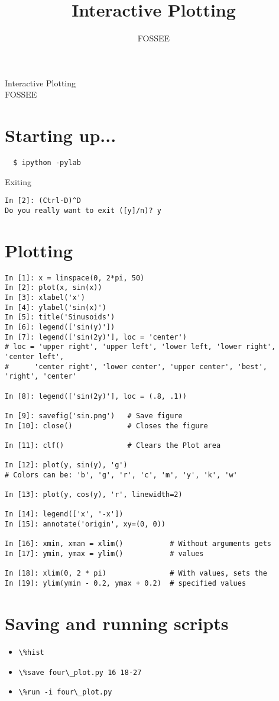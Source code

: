 \documentclass[12pt]{article}
\title{Interactive Plotting}
\author{FOSSEE}
\newcommand{\typ}[1]{\lstinline{#1}}
\begin{document}
\date{}
\vspace{-1in}
\begin{center}
\LARGE{Interactive Plotting}\\
\large{FOSSEE}
\end{center}
\section{Starting up...}

\begin{lstlisting}
  $ ipython -pylab  
\end{lstlisting}
Exiting 
\begin{lstlisting}     
In [2]: (Ctrl-D)^D
Do you really want to exit ([y]/n)? y
\end{lstlisting}

\section{Plotting}

  \begin{lstlisting}
In [1]: x = linspace(0, 2*pi, 50)
In [2]: plot(x, sin(x))
In [3]: xlabel('x')
In [4]: ylabel('sin(x)')
In [5]: title('Sinusoids')
In [6]: legend(['sin(y)'])
In [7]: legend(['sin(2y)'], loc = 'center')
# loc = 'upper right', 'upper left', 'lower left, 'lower right', 'center left',
#      'center right', 'lower center', 'upper center', 'best', 'right', 'center'

In [8]: legend(['sin(2y)'], loc = (.8, .1))

In [9]: savefig('sin.png')   # Save figure
In [10]: close()             # Closes the figure

In [11]: clf()               # Clears the Plot area

In [12]: plot(y, sin(y), 'g')
# Colors can be: 'b', 'g', 'r', 'c', 'm', 'y', 'k', 'w'

In [13]: plot(y, cos(y), 'r', linewidth=2)

In [14]: legend(['x', '-x'])
In [15]: annotate('origin', xy=(0, 0))

In [16]: xmin, xman = xlim()           # Without arguments gets
In [17]: ymin, ymax = ylim()           # values

In [18]: xlim(0, 2 * pi)               # With values, sets the
In [19]: ylim(ymin - 0.2, ymax + 0.2)  # specified values
  \end{lstlisting}

\section{Saving and running scripts}
\begin{itemize}
  \item \typ{\%hist}
  \item \typ{\%save four\_plot.py 16 18-27}
  \item \typ{\%run -i four\_plot.py}
\end{itemize}
\end{document}
